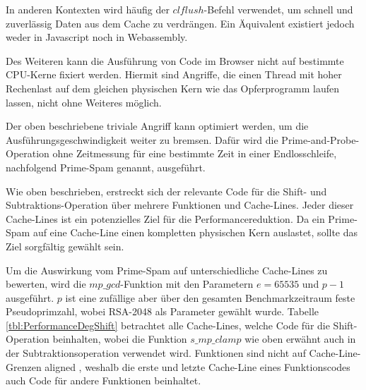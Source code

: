 In anderen Kontexten wird häufig der $clflush$-Befehl verwendet, um schnell und zuverlässig Daten aus dem Cache zu verdrängen. 
Ein Äquivalent existiert jedoch weder in Javascript noch in Webassembly.

Des Weiteren kann die Ausführung von Code im Browser nicht auf bestimmte CPU-Kerne fixiert werden. Hiermit sind Angriffe, die einen Thread mit hoher Rechenlast auf dem gleichen physischen Kern wie das Opferprogramm laufen lassen, nicht ohne Weiteres möglich.

Der oben beschriebene triviale Angriff kann optimiert werden, um die Ausführungsgeschwindigkeit weiter zu bremsen. 
Dafür wird die Prime-and-Probe-Operation ohne Zeitmessung für eine bestimmte Zeit in einer Endlosschleife, nachfolgend Prime-Spam genannt, ausgeführt.

Wie oben beschrieben, erstreckt sich der relevante Code für die Shift- und Subtraktions-Operation über mehrere Funktionen und Cache-Lines.
Jeder dieser Cache-Lines ist ein potenzielles Ziel für die Performancereduktion.
Da ein Prime-Spam auf eine Cache-Line einen kompletten physischen Kern auslastet, sollte das Ziel sorgfältig gewählt sein.

Um die Auswirkung vom Prime-Spam auf unterschiedliche Cache-Lines zu bewerten, wird die $mp\_gcd$-Funktion mit den Parametern $e=65535$ und $p-1$ ausgeführt.
$p$ ist eine zufällige aber über den gesamten Benchmarkzeitraum feste Pseudoprimzahl, wobei RSA-2048 als Parameter gewählt wurde.
Tabelle \ref{tbl:PerformanceDegShift} betrachtet alle Cache-Lines, welche Code für die Shift-Operation beinhalten, wobei die Funktion $s\_mp\_clamp$ wie oben erwähnt auch in der Subtraktionsoperation verwendet wird.
Funktionen sind nicht auf Cache-Line-Grenzen aligned
, weshalb die erste und letzte Cache-Line eines Funktionscodes auch Code für andere Funktionen beinhaltet.

